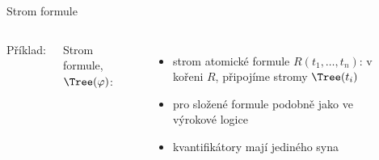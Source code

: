 \documentclass{beamer}
\begin{document}
\begin{frame}{Strom formule}

    \begin{columns}
        

        Příklad:  \pause 

        \bigskip

        \alert{Strom formule}, \alert{$\Tree(\varphi)$}: \pause 
        
        \begin{itemize}
            \item strom atomické formule $R(t_1,\dots,t_n)$: v kořeni $R$, připojíme stromy $\Tree(t_i)$ \pause 
            \item pro složené formule podobně jako ve výrokové logice \pause 
            \item kvantifikátory mají jediného syna \pause 
        \end{itemize}

        \vspace{1.5cm}


        \begin{center}
        \end{center}

    \end{columns}

\end{frame}
\end{document}
